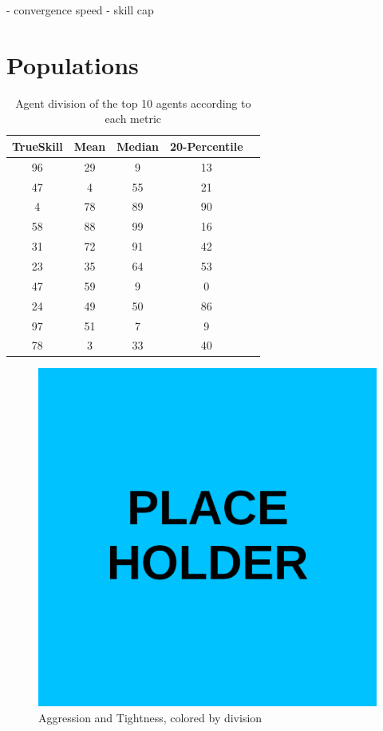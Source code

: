 \begin{code}
    - convergence speed
    - skill cap
\end{code}

\section{Populations}
\begin{table}[H]
\centering
\begin{tabular}{|| c | c | c | c | c ||} 
 \hline
 TrueSkill & Mean & Median & 20-Percentile \\ [0.5ex] 
 \hline\hline
    96 &    29 &       9 &             13 \\
    47 &     4 &      55 &             21 \\
     4 &    78 &      89 &             90 \\
    58 &    88 &      99 &             16 \\
    31 &    72 &      91 &             42 \\
    23 &    35 &      64 &             53 \\
    47 &    59 &       9 &              0 \\
    24 &    49 &      50 &             86 \\
    97 &    51 &       7 &              9 \\
    78 &     3 &      33 &             40 \\ [1ex] 
 \hline
\end{tabular}
\label{DivisionRankings}
\caption{Agent division of the top 10 agents according to each metric}
\end{table}

\begin{figure}[H]
\centering
    \includegraphics[width=0.8\linewidth]{Results/figures/placeholder.png}
\caption{Aggression and Tightness, colored by division}
\label{AggTightDivision}
\end{figure}

